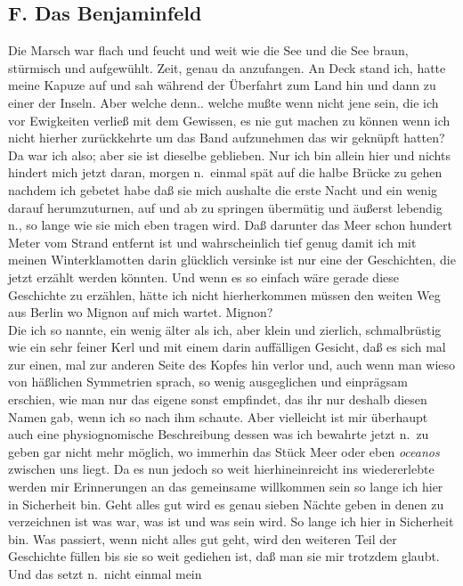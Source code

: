\documentclass[
]{article}
\author{}
\date{\vspace{-2.5em}}
\begin{document}
\subsection{F. Das Benjaminfeld}\label{f.-das-benjaminfeld}

Die Marsch war flach und feucht und weit wie die See und die See braun,
stürmisch und aufgewühlt. Zeit, genau da anzufangen. An Deck stand ich,
hatte meine Kapuze auf und sah während der Überfahrt zum Land hin und
dann zu einer der Inseln. Aber welche denn.. welche mußte wenn nicht
jene sein, die ich vor Ewigkeiten verließ mit dem Gewissen, es nie gut
machen zu können wenn ich nicht hierher zurückkehrte um das Band
aufzunehmen das wir geknüpft hatten? Da war ich also; aber sie ist
dieselbe geblieben. Nur ich bin allein hier und nichts hindert mich
jetzt daran, morgen n.~einmal spät auf die halbe Brücke zu gehen nachdem
ich gebetet habe daß sie mich aushalte die erste Nacht und ein wenig
darauf herumzuturnen, auf und ab zu springen übermütig und äußerst
lebendig n., so lange wie sie mich eben tragen wird. Daß darunter das
Meer schon hundert Meter vom Strand entfernt ist und wahrscheinlich tief
genug damit ich mit meinen Winterklamotten darin glücklich versinke ist
nur eine der Geschichten, die jetzt erzählt werden könnten. Und wenn es
so einfach wäre gerade diese Geschichte zu erzählen, hätte ich nicht
hierherkommen müssen den weiten Weg aus Berlin wo Mignon auf mich
wartet. Mignon?\\
Die ich so nannte, ein wenig älter als ich, aber klein und zierlich,
schmalbrüstig wie ein sehr feiner Kerl und mit einem darin auffälligen
Gesicht, daß es sich mal zur einen, mal zur anderen Seite des Kopfes hin
verlor und, auch wenn man wieso von häßlichen Symmetrien sprach, so
wenig ausgeglichen und einprägsam erschien, wie man nur das eigene sonst
empfindet, das ihr nur deshalb diesen Namen gab, wenn ich so nach ihm
schaute. Aber vielleicht ist mir überhaupt auch eine physiognomische
Beschreibung dessen was ich bewahrte jetzt n.~zu geben gar nicht mehr
möglich, wo immerhin das Stück Meer oder eben \emph{oceanos} zwischen
uns liegt. Da es nun jedoch so weit hierhineinreicht ins wiedererlebte
werden mir Erinnerungen an das gemeinsame willkommen sein so lange ich
hier in Sicherheit bin. Geht alles gut wird es genau sieben Nächte geben
in denen zu verzeichnen ist was war, was ist und was sein wird. So lange
ich hier in Sicherheit bin. Was passiert, wenn nicht alles gut geht,
wird den weiteren Teil der Geschichte füllen bis sie so weit gediehen
ist, daß man sie mir trotzdem glaubt. Und das setzt n.~nicht einmal mein
\end{document}

